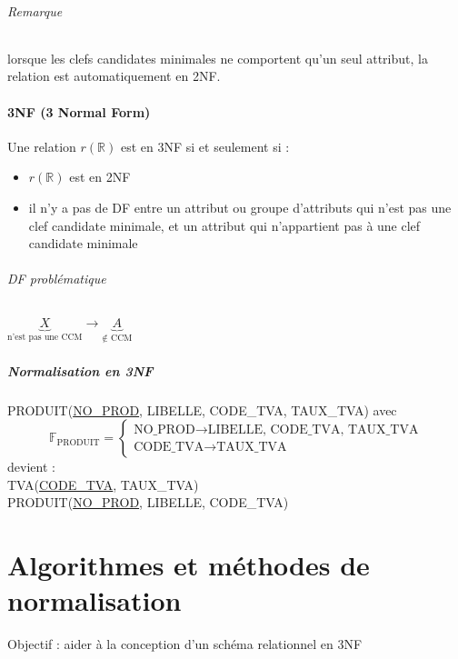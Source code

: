 \documentclass[10pt]{article}
\begin{document}
                \paragraph{Remarque} lorsque les clefs candidates minimales ne comportent qu'un seul attribut, la relation est automatiquement en 2NF.

        \subsection{3NF (3 Normal Form)}
            Une relation $r(\mathbb{R})$ est en 3NF si et seulement si :
            \begin{itemize}
                \item $r(\mathbb{R})$ est en 2NF
                \item il n'y a pas de DF entre un attribut ou groupe d'attributs qui n'est pas une clef candidate minimale, et un attribut qui n'appartient pas à une clef candidate minimale
            \end{itemize}

            \paragraph{DF problématique} $\underbrace{X}_{\text{n'est pas une CCM}} \rightarrow \underbrace{A}_{\notin\text{ CCM}}$

            \subsubsection{Normalisation en 3NF}
            PRODUIT(\underline{NO\_PROD}, LIBELLE, CODE\_TVA, TAUX\_TVA) avec
            $$\mathbb{F}_{\text{PRODUIT}} = \left\{\begin{array}{l}
                \text{NO\_PROD} \rightarrow \text{LIBELLE, CODE\_TVA, TAUX\_TVA}\\
                \text{CODE\_TVA} \rightarrow \text{TAUX\_TVA}
            \end{array}\right.$$
            devient :\\
            TVA(\underline{CODE\_TVA}, TAUX\_TVA)\\
            PRODUIT(\underline{NO\_PROD}, LIBELLE, CODE\_TVA)

\newpage
\part{Algorithmes et méthodes de normalisation}
    Objectif : aider à la conception d'un schéma relationnel en 3NF
\end{document}
